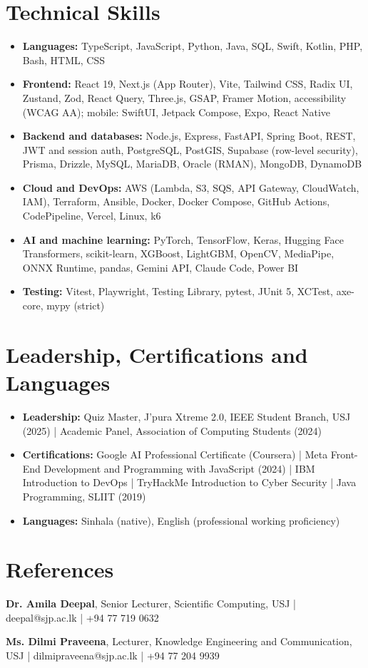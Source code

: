 \documentclass[10pt,a4paper]{article}
\begin{document}
\section{Technical Skills}
\begin{itemize}
  \item \textbf{Languages:} TypeScript, JavaScript, Python, Java, SQL, Swift, Kotlin, PHP, Bash, HTML, CSS
  \item \textbf{Frontend:} React 19, Next.js (App Router), Vite, Tailwind CSS, Radix UI, Zustand, Zod, React Query, Three.js, GSAP, Framer Motion, accessibility (WCAG AA); mobile: SwiftUI, Jetpack Compose, Expo, React Native
  \item \textbf{Backend and databases:} Node.js, Express, FastAPI, Spring Boot, REST, JWT and session auth, PostgreSQL, PostGIS, Supabase (row-level security), Prisma, Drizzle, MySQL, MariaDB, Oracle (RMAN), MongoDB, DynamoDB
  \item \textbf{Cloud and DevOps:} AWS (Lambda, S3, SQS, API Gateway, CloudWatch, IAM), Terraform, Ansible, Docker, Docker Compose, GitHub Actions, CodePipeline, Vercel, Linux, k6
  \item \textbf{AI and machine learning:} PyTorch, TensorFlow, Keras, Hugging Face Transformers, scikit-learn, XGBoost, LightGBM, OpenCV, MediaPipe, ONNX Runtime, pandas, Gemini API, Claude Code, Power BI
  \item \textbf{Testing:} Vitest, Playwright, Testing Library, pytest, JUnit 5, XCTest, axe-core, mypy (strict)
\end{itemize}

\section{Leadership, Certifications and Languages}
\begin{itemize}
  \item \textbf{Leadership:} Quiz Master, J'pura Xtreme 2.0, IEEE Student Branch, USJ (2025) | Academic Panel, Association of Computing Students (2024)
  \item \textbf{Certifications:} Google AI Professional Certificate (Coursera) | Meta Front-End Development and Programming with JavaScript (2024) | IBM Introduction to DevOps | TryHackMe Introduction to Cyber Security | Java Programming, SLIIT (2019)
  \item \textbf{Languages:} Sinhala (native), English (professional working proficiency)
\end{itemize}

\section{References}
\textbf{Dr. Amila Deepal}, Senior Lecturer, Scientific Computing, USJ | deepal@sjp.ac.lk | +94 77 719 0632\par
\textbf{Ms. Dilmi Praveena}, Lecturer, Knowledge Engineering and Communication, USJ | dilmipraveena@sjp.ac.lk | +94 77 204 9939
\end{document}
